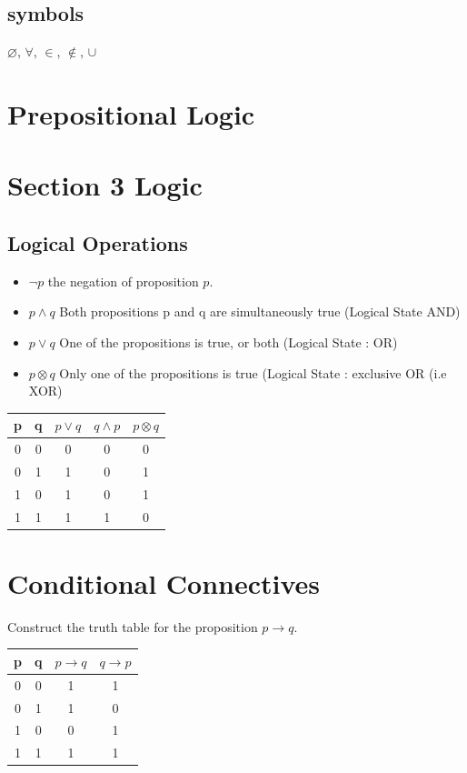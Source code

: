 \documentclass[]{report}
\begin{document}
\subsection*{symbols}
$\varnothing$,
$\forall$,
$\in$,
$\notin$,
$\cup$
\newpage

\section*{Prepositional Logic}


\newpage
\section{Section 3 Logic}
\subsection{Logical Operations}
\begin{itemize}
	\item $\neg p$ the negation of proposition $p$.
	\item $p \wedge q$ Both propositions p and q are simultaneously true (Logical State AND)
	\item $p \vee q $ One of the propositions is true, or both (Logical State : OR)
	\item $p \otimes q$ Only one of the propositions is true (Logical State : exclusive OR (i.e XOR)
\end{itemize}
\begin{center}
	\begin{tabular}{|c|c|c|c|c|}
		\hline
		p & q & $p \vee q$ & $q \wedge p$ & $p \otimes q$ \\
		\hline
		0 & 0 & 0 & 0 & 0 \\
		0 & 1 & 1 & 0 & 1\\
		1 & 0 & 1 & 0 & 1 \\
		1 & 1 & 1 & 1 & 0\\
		\hline
	\end{tabular}
\end{center}
\section{Conditional Connectives}
Construct the truth table for the proposition $p \rightarrow q$.

\begin{center}
	\begin{tabular}{|c|c|c|c|}
		\hline
		p & q & $p \rightarrow q$ & $q \rightarrow p$ \\
		\hline
		0 & 0 & 1& 1 \\
		0 & 1 & 1 & 0 \\
		1 & 0 & 0 & 1 \\
		1 & 1 & 1 & 1 \\
		\hline
	\end{tabular}
\end{center}
\end{document}
